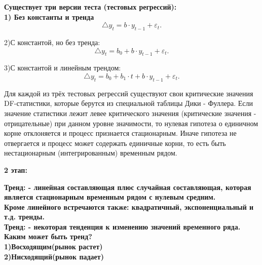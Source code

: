 \documentclass[12pt,a4paper]{paper}
\begin{document}
\bfseries{Существует три версии теста (тестовых регрессий):} \mdseries\\

1) Без константы и тренда\\

    $$\triangle y_{t}=b\cdot y_{{t-1}}+\varepsilon _{t}.$$

2)С константой, но без тренда:\\

    $$\triangle y_{t}=b_{0}+b\cdot y_{{t-1}}+\varepsilon _{t}.$$

3)С константой и линейным трендом:\\

    $$\triangle y_{t}=b_{0}+b_{1}\cdot t+b\cdot y_{{t-1}}+\varepsilon _{t}.$$
    
    
Для каждой из трёх тестовых регрессий существуют свои критические значения DF-статистики, которые берутся из специальной таблицы Дики - Фуллера. Если значение статистики лежит левее критического значения (критические значения - отрицательные) при данном уровне значимости, то нулевая гипотеза о единичном корне отклоняется и процесс признается стационарным. Иначе гипотеза не отвергается и процесс может содержать единичные корни, то есть быть нестационарным (интегрированным) временным рядом.\\
\hline  \hline


\newpage


\hline  \hline
\begin{center}
\bfseries\large{2 этап:}\\
\end{center}


\bfseries{Тренд:} \mdseries - линейная составляющая плюс случайная составляющая, которая является стационарным временным рядом с нулевым средним.\\

Кроме линейного встречаются также: квадратичный, экспоненциальный и т.д. тренды.\\

\bfseries{Тренд:} \mdseries- некоторая тенденция к изменению значений временного ряда.\\

\bfseries{Каким может быть тренд?} \mdseries\\

1)Восходящим(рынок растет)\\

2)Нисходящий(рынок падает)\\
\end{document}
